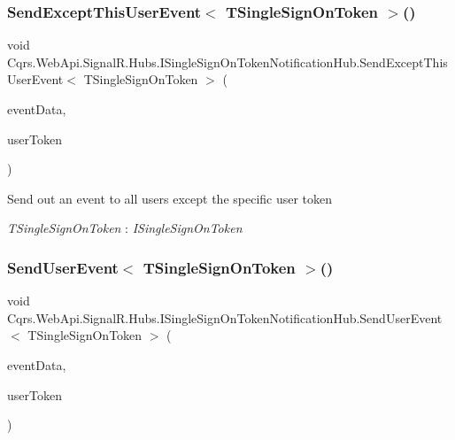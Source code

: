 \subsubsection{\texorpdfstring{Send\+Except\+This\+User\+Event$<$ T\+Single\+Sign\+On\+Token $>$()}{SendExceptThisUserEvent< TSingleSignOnToken >()}}
{\footnotesize\ttfamily void Cqrs.\+Web\+Api.\+Signal\+R.\+Hubs.\+I\+Single\+Sign\+On\+Token\+Notification\+Hub.\+Send\+Except\+This\+User\+Event$<$ T\+Single\+Sign\+On\+Token $>$ (\begin{DoxyParamCaption}\item[{\hyperlink{interfaceCqrs_1_1Events_1_1IEvent}{I\+Event}$<$ T\+Single\+Sign\+On\+Token $>$}]{event\+Data,  }\item[{string}]{user\+Token }\end{DoxyParamCaption})}



Send out an event to all users except the specific user token 

\begin{Desc}
\item[Type Constraints]\begin{description}
\item[{\em T\+Single\+Sign\+On\+Token} : {\em I\+Single\+Sign\+On\+Token}]\end{description}
\end{Desc}
\mbox{\label{interfaceCqrs_1_1WebApi_1_1SignalR_1_1Hubs_1_1ISingleSignOnTokenNotificationHub_a75a957ea5a28ba4c87cc46863d78e4d1}} 
\subsubsection{\texorpdfstring{Send\+User\+Event$<$ T\+Single\+Sign\+On\+Token $>$()}{SendUserEvent< TSingleSignOnToken >()}}
{\footnotesize\ttfamily void Cqrs.\+Web\+Api.\+Signal\+R.\+Hubs.\+I\+Single\+Sign\+On\+Token\+Notification\+Hub.\+Send\+User\+Event$<$ T\+Single\+Sign\+On\+Token $>$ (\begin{DoxyParamCaption}\item[{\hyperlink{interfaceCqrs_1_1Events_1_1IEvent}{I\+Event}$<$ T\+Single\+Sign\+On\+Token $>$}]{event\+Data,  }\item[{string}]{user\+Token }\end{DoxyParamCaption})}



